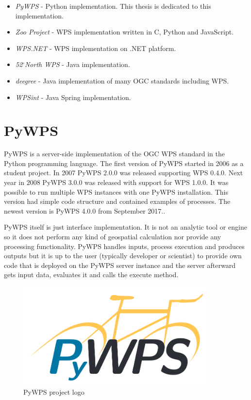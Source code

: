 \documentclass[12pt,a4paper]{article}
\begin{document}
\begin{itemize}
\item \textit{PyWPS} - Python implementation. This thesis is dedicated to this implementation.
\item \textit{Zoo Project} - WPS implementation written in C, Python and JavaScript.
\item \textit{WPS.NET} - WPS implementation on .NET platform.
\item \textit{52$^{\circ}$North WPS} - Java implementation.
\item \textit{deegree} - Java implementation of many OGC standards including WPS.
\item \textit{WPSint} - Java Spring implementation.
\end{itemize}

\newpage
\section{PyWPS}
PyWPS is a server-side implementation of the OGC WPS standard in the Python programming language.
The first version of PyWPS started in 2006 as a student project. In 2007 PyWPS 2.0.0 was released supporting WPS 0.4.0.
Next year in 2008 PyWPS 3.0.0 was released with support for WPS 1.0.0. It was possible to run multiple WPS instances
with one PyWPS installation. This version had simple code structure and contained examples of processes. The newest version 
is PyWPS 4.0.0 from September 2017.\cite{PyWPS_presentation}.

PyWPS itself is just interface implementation. It is not an analytic tool or engine so it does not perform any kind of
geospatial calculation nor provide any processing functionality. PyWPS handles inputs, process execution and produces outputs
but it is up to the user (typically developer or scientist) to provide own code that is deployed on the PyWPS server
instance and the server afterward gets input data, evaluates it and calls the execute method.

\begin{figure}[h!]
\centering
\includegraphics[width=0.9\textwidth]{img/pywps_logo.png}
\caption{PyWPS project logo}
\label{fig:pywps_logo}
\end{figure}
\end{document}
